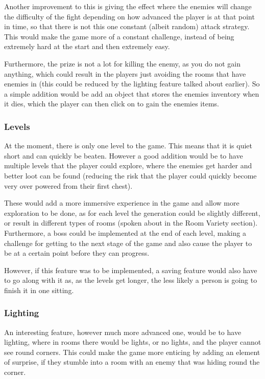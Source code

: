 \documentclass[../Main.tex]{subfiles}
\begin{document}
            Another improvement to this is giving the effect where the enemies will change the difficulty of the fight depending on how advanced the player is at that point in time, so that there is not this one constant (albeit random) attack strategy. This would make the game more of a constant challenge, instead of being extremely hard at the start and then extremely easy.

            Furthermore, the prize is not a lot for killing the enemy, as you do not gain anything, which could result in the players just avoiding the rooms that have enemies in (this could be reduced by the lighting feature talked about earlier). So a simple addition would be add an object that stores the enemies inventory when it dies, which the player can then click on to gain the enemies items.

        \subsubsection{Levels}
            At the moment, there is only one level to the game. This means that it is quiet short and can quickly be beaten. However a good addition would be to have multiple levels that the player could explore, where the enemies get harder and better loot can be found (reducing the risk that the player could quickly become very over powered from their first chest).

            These would add a more immersive experience in the game and allow more exploration to be done, as for each level the generation could be slightly different, or result in different types of rooms (spoken about in the Room Variety section). Furthermore, a boss could be implemented at the end of each level, making a challenge for getting to the next stage of the game and also cause the player to be at a certain point before they can progress.

            However, if this feature was to be implemented, a saving feature would also have to go along with it as, as the levels get longer, the less likely a person is going to finish it in one sitting.

        \subsubsection{Lighting}
            An interesting feature, however much more advanced one, would be to have lighting, where in rooms there would be lights, or no lights, and the player cannot see round corners. This could make the game more enticing by adding an element of surprise, if they stumble into a room with an enemy that was hiding round the corner.
\end{document}
